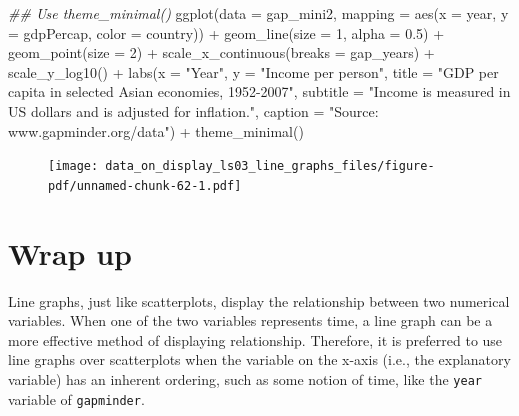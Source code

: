 \documentclass[
  letterpaper,
  DIV=11,
  numbers=noendperiod]{scrreprt}
\newenvironment{Shaded}{\begin{snugshade}}{\end{snugshade}}
\newcommand{\AttributeTok}[1]{\textcolor[rgb]{0.40,0.45,0.13}{#1}}
\newcommand{\DecValTok}[1]{\textcolor[rgb]{0.68,0.00,0.00}{#1}}
\newcommand{\DocumentationTok}[1]{\textcolor[rgb]{0.37,0.37,0.37}{\textit{#1}}}
\newcommand{\FloatTok}[1]{\textcolor[rgb]{0.68,0.00,0.00}{#1}}
\newcommand{\FunctionTok}[1]{\textcolor[rgb]{0.28,0.35,0.67}{#1}}
\newcommand{\NormalTok}[1]{\textcolor[rgb]{0.00,0.23,0.31}{#1}}
\newcommand{\SpecialCharTok}[1]{\textcolor[rgb]{0.37,0.37,0.37}{#1}}
\newcommand{\StringTok}[1]{\textcolor[rgb]{0.13,0.47,0.30}{#1}}
\begin{document}
\begin{Shaded}
\begin{Highlighting}[]
\DocumentationTok{\#\# Use theme\_minimal()}
\FunctionTok{ggplot}\NormalTok{(}\AttributeTok{data =}\NormalTok{ gap\_mini2, }
       \AttributeTok{mapping =} \FunctionTok{aes}\NormalTok{(}\AttributeTok{x =}\NormalTok{ year, }
                     \AttributeTok{y =}\NormalTok{ gdpPercap, }
                     \AttributeTok{color =}\NormalTok{ country)) }\SpecialCharTok{+}
  \FunctionTok{geom\_line}\NormalTok{(}\AttributeTok{size =} \DecValTok{1}\NormalTok{, }\AttributeTok{alpha =} \FloatTok{0.5}\NormalTok{) }\SpecialCharTok{+}
  \FunctionTok{geom\_point}\NormalTok{(}\AttributeTok{size =} \DecValTok{2}\NormalTok{) }\SpecialCharTok{+}
  \FunctionTok{scale\_x\_continuous}\NormalTok{(}\AttributeTok{breaks =}\NormalTok{ gap\_years) }\SpecialCharTok{+}
  \FunctionTok{scale\_y\_log10}\NormalTok{() }\SpecialCharTok{+}
  \FunctionTok{labs}\NormalTok{(}\AttributeTok{x =} \StringTok{"Year"}\NormalTok{, }
       \AttributeTok{y =} \StringTok{"Income per person"}\NormalTok{,}
       \AttributeTok{title =} \StringTok{"GDP per capita in selected Asian economies, 1952{-}2007"}\NormalTok{,}
       \AttributeTok{subtitle =} \StringTok{"Income is measured in US dollars and is adjusted for inflation."}\NormalTok{,}
       \AttributeTok{caption =} \StringTok{"Source: www.gapminder.org/data"}\NormalTok{) }\SpecialCharTok{+}
  \FunctionTok{theme\_minimal}\NormalTok{()}
\end{Highlighting}
\end{Shaded}

\begin{figure}[H]

{\centering \texttt{[image: data\_on\_display\_ls03\_line\_graphs\_files/figure-pdf/unnamed-chunk-62-1.pdf]}

}

\end{figure}

\hypertarget{wrap-up}{%
\section{Wrap up}\label{wrap-up}}

Line graphs, just like scatterplots, display the relationship between
two numerical variables. When one of the two variables represents time,
a line graph can be a more effective method of displaying relationship.
Therefore, it is preferred to use line graphs over scatterplots when the
variable on the x-axis (i.e., the explanatory variable) has an inherent
ordering, such as some notion of time, like the \texttt{year} variable
of \texttt{gapminder}.
\end{document}
